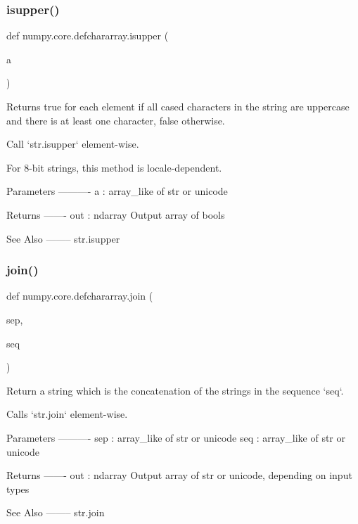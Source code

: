 \subsubsection{\texorpdfstring{isupper()}{isupper()}}
{\footnotesize\ttfamily def numpy.\+core.\+defchararray.\+isupper (\begin{DoxyParamCaption}\item[{}]{a }\end{DoxyParamCaption})}

\begin{DoxyVerb}Returns true for each element if all cased characters in the
string are uppercase and there is at least one character, false
otherwise.

Call `str.isupper` element-wise.

For 8-bit strings, this method is locale-dependent.

Parameters
----------
a : array_like of str or unicode

Returns
-------
out : ndarray
    Output array of bools

See Also
--------
str.isupper
\end{DoxyVerb}
 \mbox{\label{namespacenumpy_1_1core_1_1defchararray_a06e32ed9d4e21fa96a6899d57b157954}} 
\subsubsection{\texorpdfstring{join()}{join()}}
{\footnotesize\ttfamily def numpy.\+core.\+defchararray.\+join (\begin{DoxyParamCaption}\item[{}]{sep,  }\item[{}]{seq }\end{DoxyParamCaption})}

\begin{DoxyVerb}Return a string which is the concatenation of the strings in the
sequence `seq`.

Calls `str.join` element-wise.

Parameters
----------
sep : array_like of str or unicode
seq : array_like of str or unicode

Returns
-------
out : ndarray
    Output array of str or unicode, depending on input types

See Also
--------
str.join
\end{DoxyVerb}
 \mbox{\label{namespacenumpy_1_1core_1_1defchararray_a1987c20db9730545e89c18fa8bf56e05}} 
